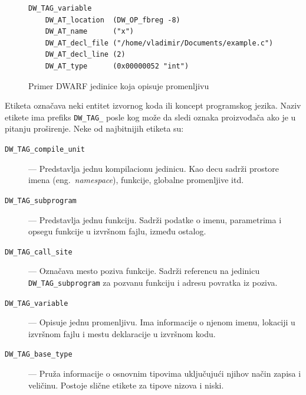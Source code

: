\documentclass[12pt,oneside]{memoir}
\begin{document}
\begin{figure}[!ht]
\begin{verbatim}
DW_TAG_variable
    DW_AT_location  (DW_OP_fbreg -8)
    DW_AT_name      ("x")
    DW_AT_decl_file ("/home/vladimir/Documents/example.c")
    DW_AT_decl_line (2)
    DW_AT_type      (0x00000052 "int")
\end{verbatim}
\caption{Primer DWARF jedinice koja opisuje promenljivu}
\label{lst:dwarf_variable}
\end{figure}

Etiketa označava neki entitet izvornog koda ili koncept programskog jezika.
Naziv etikete ima prefiks \verb|DW_TAG_| posle kog može da sledi oznaka proizvođača ako je u pitanju proširenje.
Neke od najbitnijih etiketa su:
\begin{description}
  \item[\texttt{DW\_TAG\_compile\_unit}] --- Predstavlja jednu kompilacionu jedinicu. Kao decu sadrži prostore imena (eng.~{\em namespace}), funkcije, globalne promenljive itd.
  \item[\texttt{DW\_TAG\_subprogram}] --- Predstavlja jednu funkciju. Sadrži podatke o imenu, parametrima i opsegu funkcije u izvršnom fajlu, između ostalog.
  \item[\texttt{DW\_TAG\_call\_site}] --- Označava mesto poziva funkcije. Sadrži referencu na jedinicu \verb|DW_TAG_subprogram| za pozvanu funkciju i adresu povratka iz poziva.
  \item[\texttt{DW\_TAG\_variable}] --- Opisuje jednu promenljivu. Ima informacije o njenom imenu, lokaciji u izvršnom fajlu i mestu deklaracije u izvršnom kodu.
  \item[\texttt{DW\_TAG\_base\_type}] --- Pruža informacije o osnovnim tipovima uključujući njihov način zapisa i veličinu. Postoje slične etikete za tipove nizova i niski.
\end{description}
\end{document}
